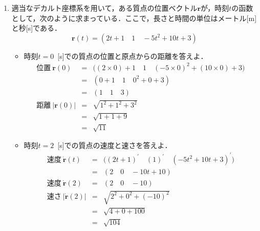 \documentclass[a4paper,11pt]{ltjsarticle}
\begin{document}
  \begin{enumerate}
    \item 適当なデカルト座標系を用いて，ある質点の位置ベクトル$\bm{r}$が，時刻$t$の函数として，次のように求まっている．ここで，長さと時間の単位はメートル[m]と秒[s]である．
    \begin{equation}
      \bm{r}(t)=(2t+1 \quad 1 \quad -5t^{2}+10t+3)
    \end{equation}
    \begin{itemize}
      \item 時刻$t=0$\ [s]での質点の位置と原点からの距離を答えよ．
      \begin{equation}
        \renewcommand{\arraystretch}{2}
        \begin{array}{rcl}
          位置\ \bm{r}(0)
          &=&
          \Big((2 \times 0)+1 \quad 1 \quad (-5 \times 0)^{2}+(10 \times 0)+3\Big)
          \\
          &=&
          (0+1 \quad 1 \quad 0^{2}+0+3)
          \\
          &=&
          (1 \quad 1 \quad 3)
          \\
          距離\ |\bm{r}(0)|
          &=&
          \sqrt{1^{2}+1^{2}+3^{2}}
          \\
          &=&
          \sqrt{1+1+9}
          \\
          &=&
          \sqrt{11}
        \end{array}
      \end{equation}
      \item 時刻$t=2$\ [s]での質点の速度と速さを答えよ．
      \begin{equation}
        \renewcommand{\arraystretch}{2}
        \begin{array}{rcl}
          速度\ \dot{\bm{r}}(t)
          &=&
          \Big((2t+1)^{\prime} \quad (1)^{\prime} \quad (-5t^{2}+10t+3)^{\prime}\Big)
          \\
          &=&
          (2 \quad 0 \quad -10t+10)
          \\
        　速度\ \dot{\bm{r}}(2)
          &=&
          (2 \quad 0 \quad -10)
          \\
          速さ\ |\dot{\bm{r}}(2)|
          &=&
          \sqrt{2^{2}+0^{2}+(-10)^{2}}
          \\
          &=&
          \sqrt{4+0+100}
          \\
          &=&
          \sqrt{104}
        \end{array}
      \end{equation}

\end{itemize}
\end{enumerate}
\end{document}
